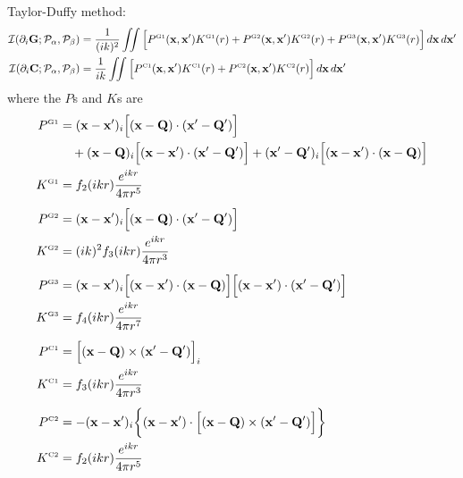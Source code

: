 \documentclass[letterpaper]{article}
\begin{document}
Taylor-Duffy method:
\begin{align*}
 \mathcal{I}(\partial_i \mathbf{G};  \mathcal{P}_\alpha, \mathcal{P}_\beta)
&=\frac{1}{(ik)^2}
\iint \Big[  P^{\hbox{\tiny{G1}}}(\mathbf{x}, \mathbf{x}^\prime) K^{\hbox{\tiny{G1}}}(r)
             + P^{\hbox{\tiny{G2}}}(\mathbf{x}, \mathbf{x}^\prime) K^{\hbox{\tiny{G2}}}(r)
             + P^{\hbox{\tiny{G3}}}(\mathbf{x}, \mathbf{x}^\prime) K^{\hbox{\tiny{G3}}}(r)
        \Big]\,d\mathbf{x}\,d\mathbf{x}^\prime
\\
 \mathcal{I}(\partial_i \mathbf{C}; \mathcal{P}_\alpha, \mathcal{P}_\beta)
&=\frac{1}{ik}
  \iint \Big[  P^{\hbox{\tiny{C1}}}(\mathbf{x}, \mathbf{x}^\prime) K^{\hbox{\tiny{C1}}}(r)
              +P^{\hbox{\tiny{C2}}}(\mathbf{x}, \mathbf{x}^\prime) K^{\hbox{\tiny{C2}}}(r)
        \Big]\,d\mathbf{x} \, d\mathbf{x}^\prime
\end{align*}
where the $P$s and $K$s are
\begin{align*}
P^{\hbox{\tiny{G1}}} 
 &= (\mathbf{x} - \mathbf{x}^\prime)_i 
    \Big[ (\mathbf{x}-\mathbf{Q}) \cdot (\mathbf{x}^\prime-\mathbf{Q}^\prime)\Big] 
\\
 &\quad + (\mathbf{x}-\mathbf{Q})_i 
          \Big[ (\mathbf{x} - \mathbf{x}^\prime) \cdot (\mathbf{x}^\prime-\mathbf{Q}^\prime) \Big]
        + (\mathbf{x}^\prime-\mathbf{Q}^\prime)_i 
          \Big[ (\mathbf{x} - \mathbf{x}^\prime) \cdot (\mathbf{x}-\mathbf{Q}) \Big]
\\
K^{\hbox{\tiny{G1}}}
&= f_2(ikr)\frac{e^{ikr}}{4\pi r^5}
\\[5pt]
P^{\hbox{\tiny{G2}}}
&=(\mathbf{x} - \mathbf{x}^\prime)_i 
   \Big[(\mathbf{x}-\mathbf{Q}) \cdot (\mathbf{x}^\prime-\mathbf{Q}^\prime)\Big]
\\
K^{\hbox{\tiny{G2}}}
&= (ik)^2 f_3(ikr)\frac{e^{ikr}}{4\pi r^3}
\\[5pt]
P^{\hbox{\tiny{G3}}} 
&=(\mathbf{x} - \mathbf{x}^\prime)_i 
   \Big[ (\mathbf{x}-\mathbf{x}^\prime) \cdot (\mathbf{x}-\mathbf{Q})  \Big]
   \Big[ (\mathbf{x}-\mathbf{x}^\prime) \cdot (\mathbf{x}^\prime-\mathbf{Q}^\prime)  \Big]
\\
K^{\hbox{\tiny{G3}}}
&= f_4(ikr)\frac{e^{ikr}}{4\pi r^7}
\\[5pt]
P^{\hbox{\tiny{C1}}}
&=\Big[(\mathbf{x}-\mathbf{Q}) \times (\mathbf{x}^\prime - \mathbf{Q}^\prime)\Big]_i
\\
K^{\hbox{\tiny{C1}}}
&= f_3(ikr)\frac{e^{ikr}}{4\pi r^3}
\\[5pt]
P^{\hbox{\tiny{C2}}}
 &= -(\mathbf{x} - \mathbf{x}^\prime)_i
     \bigg\{ (\mathbf{x} - \mathbf{x}^\prime) \cdot 
     \Big[ (\mathbf{x}-\mathbf{Q})\times (\mathbf{x}^\prime-\mathbf{Q}^\prime) \Big]\bigg\}
\\
K^{\hbox{\tiny{C2}}}
&= 
f_2(ikr) \frac{e^{ikr}}{4\pi r^5}
\end{align*}
\end{document}

